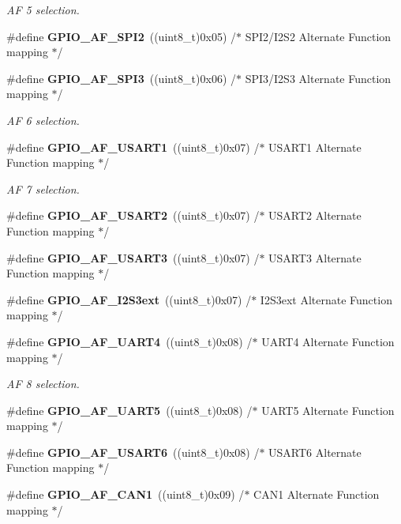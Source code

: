 \begin{DoxyCompactItemize}
\begin{DoxyCompactList}\small\item\em AF 5 selection. \end{DoxyCompactList}\item 
\#define \textbf{ G\+P\+I\+O\+\_\+\+A\+F\+\_\+\+S\+P\+I2}~((uint8\+\_\+t)0x05)  /$\ast$ S\+P\+I2/\+I2\+S2 Alternate Function mapping $\ast$/
\item 
\#define \textbf{ G\+P\+I\+O\+\_\+\+A\+F\+\_\+\+S\+P\+I3}~((uint8\+\_\+t)0x06)  /$\ast$ S\+P\+I3/\+I2\+S3 Alternate Function mapping $\ast$/
\begin{DoxyCompactList}\small\item\em AF 6 selection. \end{DoxyCompactList}\item 
\#define \textbf{ G\+P\+I\+O\+\_\+\+A\+F\+\_\+\+U\+S\+A\+R\+T1}~((uint8\+\_\+t)0x07)  /$\ast$ U\+S\+A\+R\+T1 Alternate Function mapping $\ast$/
\begin{DoxyCompactList}\small\item\em AF 7 selection. \end{DoxyCompactList}\item 
\#define \textbf{ G\+P\+I\+O\+\_\+\+A\+F\+\_\+\+U\+S\+A\+R\+T2}~((uint8\+\_\+t)0x07)  /$\ast$ U\+S\+A\+R\+T2 Alternate Function mapping $\ast$/
\item 
\#define \textbf{ G\+P\+I\+O\+\_\+\+A\+F\+\_\+\+U\+S\+A\+R\+T3}~((uint8\+\_\+t)0x07)  /$\ast$ U\+S\+A\+R\+T3 Alternate Function mapping $\ast$/
\item 
\#define \textbf{ G\+P\+I\+O\+\_\+\+A\+F\+\_\+\+I2\+S3ext}~((uint8\+\_\+t)0x07)  /$\ast$ I2\+S3ext Alternate Function mapping $\ast$/
\item 
\#define \textbf{ G\+P\+I\+O\+\_\+\+A\+F\+\_\+\+U\+A\+R\+T4}~((uint8\+\_\+t)0x08)  /$\ast$ U\+A\+R\+T4 Alternate Function mapping $\ast$/
\begin{DoxyCompactList}\small\item\em AF 8 selection. \end{DoxyCompactList}\item 
\#define \textbf{ G\+P\+I\+O\+\_\+\+A\+F\+\_\+\+U\+A\+R\+T5}~((uint8\+\_\+t)0x08)  /$\ast$ U\+A\+R\+T5 Alternate Function mapping $\ast$/
\item 
\#define \textbf{ G\+P\+I\+O\+\_\+\+A\+F\+\_\+\+U\+S\+A\+R\+T6}~((uint8\+\_\+t)0x08)  /$\ast$ U\+S\+A\+R\+T6 Alternate Function mapping $\ast$/
\item 
\#define \textbf{ G\+P\+I\+O\+\_\+\+A\+F\+\_\+\+C\+A\+N1}~((uint8\+\_\+t)0x09)  /$\ast$ C\+A\+N1 Alternate Function mapping $\ast$/

\end{DoxyCompactItemize}
